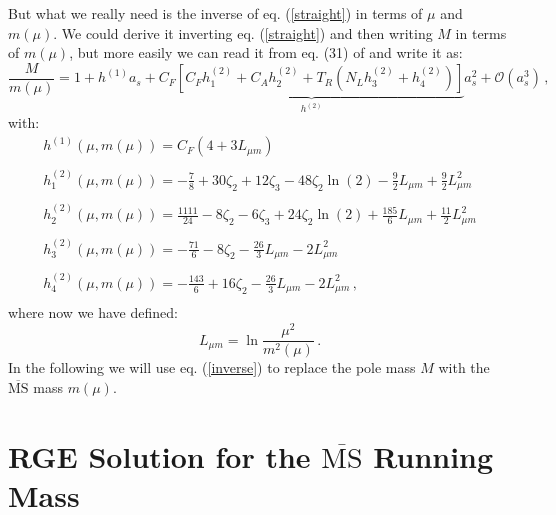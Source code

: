 \documentclass[10pt,a4paper]{article}
\begin{document}
But what we really need is the inverse of eq. (\ref{straight}) in terms of $\mu$ and $m(\mu)$. We could derive it inverting eq. (\ref{straight}) and then writing $M$ in terms of $m(\mu)$, but more easily we can read it from eq. (31) of \cite{Chetyrkin:1999qi} and write it as:
\begin{equation}\label{inverse}
\frac{M}{m(\mu)} = 1 + h^{(1)}a_s+\underbrace{C_F\left[C_Fh_1^{(2)}+C_Ah_2^{(2)}+T_R\left(N_Lh_3^{(2)}+h_4^{(2)}\right)\right]}_{h^{(2)}}a_s^2+\mathcal{O}(a_s^3)\,,
\end{equation}
with:
\begin{equation}\label{coeffinv}
\begin{array}{l}
\displaystyle h^{(1)}(\mu,m(\mu)) = C_F\left(4 + 3L_{\mu m}\right)\\
\\
\displaystyle h_{1}^{(2)}(\mu,m(\mu)) = -\frac{7}{8} + 30\zeta_2 + 12\zeta_3 - 48\zeta_2\ln(2) - \frac{9}2L_{\mu m} + \frac92 L_{\mu m}^2\\
\\
\displaystyle h_{2}^{(2)}(\mu,m(\mu)) = \frac{1111}{24} - 8\zeta_2 - 6\zeta_3 + 24\zeta_2\ln(2) + \frac{185}6L_{\mu m} + \frac{11}2 L_{\mu m}^2\\
\\
\displaystyle h_{3}^{(2)}(\mu,m(\mu)) = - \frac{71}{6} - 8\zeta_2 - \frac{26}3L_{\mu m} - 2 L_{\mu m}^2\\
\\
\displaystyle h_{4}^{(2)}(\mu,m(\mu)) = -\frac{143}{6} + 16\zeta_2 - \frac{26}3L_{\mu m} - 2 L_{\mu m}^2\,,\\
\end{array}
\end{equation}
where now we have defined:
\begin{equation}
L_{\mu m} = \ln\frac{\mu^2}{m^2(\mu)}\,.
\end{equation}
In the following we will use eq. (\ref{inverse}) to replace the pole mass $M$ with the $\overline{\mbox{MS}}$ mass $m(\mu)$.


\section{RGE Solution for the $\overline{\mbox{MS}}$ Running Mass}
\end{document}
